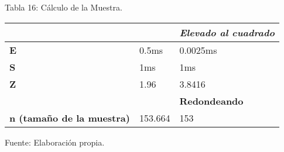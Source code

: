                 \begin{table}[h!]
                    \centering
                    { Tabla 16: Cálculo de la Muestra.}\par
                    \begin{tabular}{|p{5cm}|p{3cm}|p{5cm}|} \hline
                        
                    
                    \textit{{}} &
                    \textit{{}} &
                    \textit{{\bf{Elevado al cuadrado}}} 
                    \\ \hline
    
                    {\bf E} &
                    0.5ms &
                    0.0025ms
                    \\ \hline

                    {\bf S} &
                    1ms &
                    1ms
                    \\ \hline

                    {\bf Z} &
                    1.96 &
                    3.8416
                    \\ \hline

                    {} &
                    {} &
                    {\bf Redondeando}
                    \\ \hline

                    {\bf n (tamaño de la muestra)} &
                    153.664 &
                    153
                    \\ \hline   

                    \end{tabular}
                    \begin{center}
                        \vskip -0.2cm
                        {\small{Fuente: Elaboración propia.}}
                    \end{center}                   
                \end{table}              
